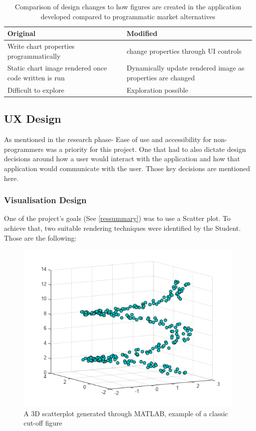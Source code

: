 \begin{table}[t]
    \begin{tabular}{ | l | l | }
        \hline
        Original                                             & Modified                                                    \\
        \hline
        Write chart properties programmatically              & change properties through UI controls                       \\
        \hline
        Static chart image rendered once code written is run & Dynamically update rendered image as properties are changed \\
        \hline
        Difficult to explore                                 & Exploration possible                                        \\
        \hline
    \end{tabular}
    \caption{Comparison of design changes to how figures are created in the application developed compared to programmatic market alternatives}
    \label{compare}
\end{table}

\subsection{UX Design} \label{uxdesign}

As mentioned in the research phase- Ease of use and accessibility for non-programmers was a priority for this project. One that had to also dictate design decisions around how a user would interact with the application and how that application would communicate with the user. Those key decisions are mentioned here.

\subsubsection{Visualisation Design} \label{visdesign}
One of the project's goals (See \ref{ressummary}) was to use a Scatter plot. To achieve that, two suitable rendering techniques were identified by the Student. Those are the following:

\begin{figure}[h]
    \centering
    \includegraphics[width=0.7\columnwidth]{author-files/figures/SetMarkerPropertiesExample_01_MATLAB.png}
    \caption{A 3D scatterplot generated through MATLAB, example of a classic cut-off figure}
    \label{fig:MatlabPlot}
\end{figure}

